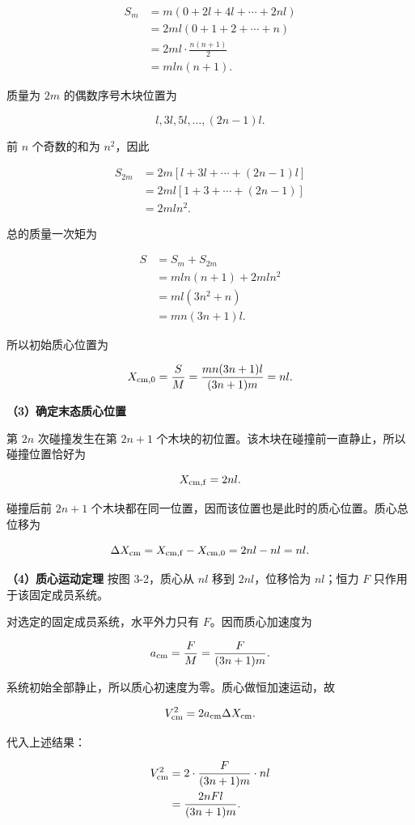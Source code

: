 \documentclass[12pt,a4paper,UTF8]{ctexart}
\begin{document}
\[\begin{aligned}
S_m
&=m(0+2l+4l+\cdots+2nl)\\
&=2ml(0+1+2+\cdots+n)\\
&=2ml\cdot\frac{n(n+1)}2\\
&=mln(n+1).
\end{aligned}\]

质量为 \(2m\) 的偶数序号木块位置为

\[l,3l,5l,\ldots,(2n-1)l.\]

前 \(n\) 个奇数的和为 \(n^2\)，因此

\[\begin{aligned}
S_{2m}
&=2m[l+3l+\cdots+(2n-1)l]\\
&=2ml[1+3+\cdots+(2n-1)]\\
&=2mln^2.
\end{aligned}\]

总的质量一次矩为

\[\begin{aligned}
S
&=S_m+S_{2m}\\
&=mln(n+1)+2mln^2\\
&=ml(3n^2+n)\\
&=mn(3n+1)l.
\end{aligned}\]

所以初始质心位置为

\[X_{\rm cm,0}=\frac{S}{M}
=\frac{mn(3n+1)l}{(3n+1)m}=nl.\]

\textbf{（3）确定末态质心位置}

第 \(2n\) 次碰撞发生在第 \(2n+1\)
个木块的初位置。该木块在碰撞前一直静止，所以碰撞位置恰好为

\[X_{\rm cm,f}=2nl.\]

碰撞后前 \(2n+1\)
个木块都在同一位置，因而该位置也是此时的质心位置。质心总位移为

\[\Delta X_{\rm cm}=X_{\rm cm,f}-X_{\rm cm,0}=2nl-nl=nl.\]

\textbf{（4）质心运动定理} 按图 3-2，质心从 \(nl\) 移到
\(2nl\)，位移恰为 \(nl\)；恒力 \(F\) 只作用于该固定成员系统。

对选定的固定成员系统，水平外力只有 \(F\)。因而质心加速度为

\[a_{\rm cm}=\frac FM=\frac{F}{(3n+1)m}.\]

系统初始全部静止，所以质心初速度为零。质心做恒加速运动，故

\[V_{\rm cm}^2=2a_{\rm cm}\Delta X_{\rm cm}.\]

代入上述结果：

\[\begin{aligned}
V_{\rm cm}^2
&=2\cdot\frac{F}{(3n+1)m}\cdot nl\\
&=\frac{2nFl}{(3n+1)m}.
\end{aligned}\]
\end{document}
